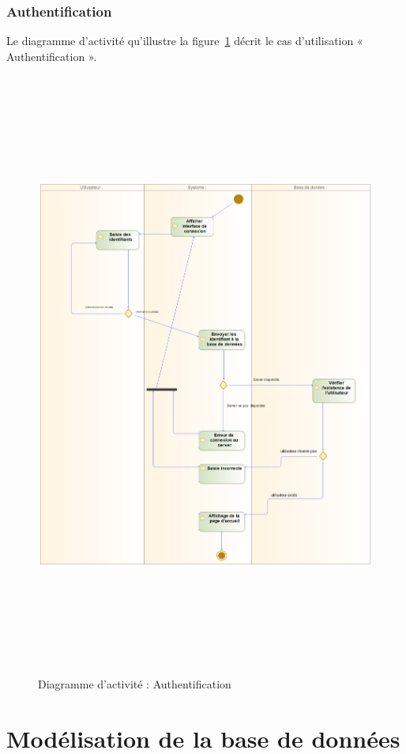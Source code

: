 \subsubsection{Authentification}
Le diagramme d’activité qu’illustre la figure~\ref{activiteAuth} décrit le cas d’utilisation « Authentification ».
\begin{figure}[h!]
	\includegraphics[width=18cm, height=20cm]{./Template LaTeX/Images/auth_act.png}
	\caption{Diagramme d'activité : Authentification}
	\label{activiteAuth}
\end{figure}


\section{Modélisation de la base de données}
